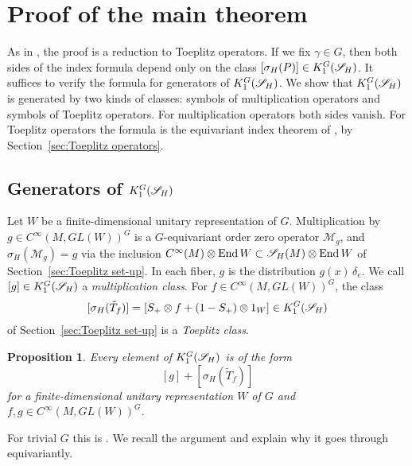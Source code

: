 \documentclass[11pt]{amsart}
\theoremstyle{plain}
\newtheorem{proposition}[theorem]{Proposition}
\theoremstyle{definition}
\theoremstyle{remark}
\begin{document}
\section{Proof of the main theorem}\label{sec:index-proof}

As in \cite{GvE20}, the proof is a reduction to Toeplitz operators.
If we fix $\gamma\in G$, then both sides of the index formula  depend only on the class $[\sigma_H(P)]\in K_1^G({\mathscr{S}_H})$.
It suffices to verify the formula for generators of $K_1^G({\mathscr{S}_H})$.
We show that $K_1^G({\mathscr{S}_H})$ is generated by two kinds of classes: symbols of multiplication operators and symbols of Toeplitz operators.
For multiplication operators both sides vanish.
For Toeplitz operators the formula is the equivariant index theorem of \cite{GvE26}, by Section~\ref{sec:Toeplitz operators}.


\subsection{Generators of $K_1^G({\mathscr{S}_H})$}\label{sec:K generation}

Let $W$ be a finite-dimensional unitary representation of $G$.
Multiplication by $g\in C^\infty(M,GL(W))^G$ is a $G$-equivariant order zero operator $\mathcal M_g$, and $\sigma_H(\mathcal M_g)=g$ via the inclusion $C^\infty(M)\otimes\operatorname{End} W\subset{\mathscr{S}_H}(M)\otimes\operatorname{End} W$ of Section~\ref{sec:Toeplitz set-up}.
In each fiber, $g$ is the distribution $g(x)\,\delta_e$.
We call $[g]\in K_1^G({\mathscr{S}_H})$ a \emph{multiplication class}.
For $f\in C^\infty(M,GL(W))^G$, the class
\[ [\sigma_H(\tilde T_f)]=[S_+\otimes f+(1-S_+)\otimes1_W]\in K_1^G({\mathscr{S}_H})\]
of Section~\ref{sec:Toeplitz set-up} is a \emph{Toeplitz class}.

\begin{proposition}\label{prop:K generation}
Every element of $K_1^G({\mathscr{S}_H})$ is of the form
\[ [g]+[\sigma_H(\tilde T_f)]\]
for a finite-dimensional unitary representation $W$ of $G$ and $f,g\in C^\infty(M,GL(W))^G$.
\end{proposition}

For trivial $G$ this is \cite[Proposition~8.1]{GvE20}.
We recall the argument and explain why it goes through equivariantly.
\end{document}
